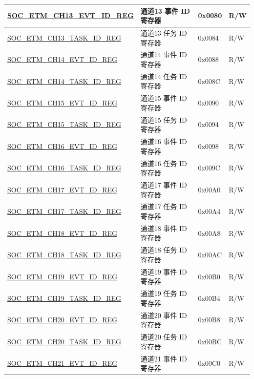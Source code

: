 \begin{longtable}{ | p{6cm} | p{6.2cm} | p{1.3cm} | p{2cm} | }
\hyperref[regdesc:SOCETMCH0EVTIDREG]{SOC\_ETM\_CH13\_EVT\_ID\_REG} & 通道13 事件 ID 寄存器 & 0x0080 & R/W \\ \hline
\hyperref[regdesc:SOCETMCH0TASKIDREG]{SOC\_ETM\_CH13\_TASK\_ID\_REG} & 通道13 任务 ID 寄存器 & 0x0084 & R/W \\ \hline
\hyperref[regdesc:SOCETMCH0EVTIDREG]{SOC\_ETM\_CH14\_EVT\_ID\_REG} & 通道14 事件 ID 寄存器 & 0x0088 & R/W \\ \hline
\hyperref[regdesc:SOCETMCH0TASKIDREG]{SOC\_ETM\_CH14\_TASK\_ID\_REG} & 通道14 任务 ID 寄存器 & 0x008C & R/W \\ \hline
\hyperref[regdesc:SOCETMCH0EVTIDREG]{SOC\_ETM\_CH15\_EVT\_ID\_REG} & 通道15 事件 ID 寄存器 & 0x0090 & R/W \\ \hline
\hyperref[regdesc:SOCETMCH0TASKIDREG]{SOC\_ETM\_CH15\_TASK\_ID\_REG} & 通道15 任务 ID 寄存器 & 0x0094 & R/W \\ \hline
\hyperref[regdesc:SOCETMCH0EVTIDREG]{SOC\_ETM\_CH16\_EVT\_ID\_REG} & 通道16 事件 ID 寄存器 & 0x0098 & R/W \\ \hline
\hyperref[regdesc:SOCETMCH0TASKIDREG]{SOC\_ETM\_CH16\_TASK\_ID\_REG} & 通道16 任务 ID 寄存器 & 0x009C & R/W \\ \hline
\hyperref[regdesc:SOCETMCH0EVTIDREG]{SOC\_ETM\_CH17\_EVT\_ID\_REG} & 通道17 事件 ID 寄存器 & 0x00A0 & R/W \\ \hline
\hyperref[regdesc:SOCETMCH0TASKIDREG]{SOC\_ETM\_CH17\_TASK\_ID\_REG} & 通道17 任务 ID 寄存器 & 0x00A4 & R/W \\ \hline
\hyperref[regdesc:SOCETMCH0EVTIDREG]{SOC\_ETM\_CH18\_EVT\_ID\_REG} & 通道18 事件 ID 寄存器 & 0x00A8 & R/W \\ \hline
\hyperref[regdesc:SOCETMCH0TASKIDREG]{SOC\_ETM\_CH18\_TASK\_ID\_REG} & 通道18 任务 ID 寄存器 & 0x00AC & R/W \\ \hline
\hyperref[regdesc:SOCETMCH0EVTIDREG]{SOC\_ETM\_CH19\_EVT\_ID\_REG} & 通道19 事件 ID 寄存器 & 0x00B0 & R/W \\ \hline
\hyperref[regdesc:SOCETMCH0TASKIDREG]{SOC\_ETM\_CH19\_TASK\_ID\_REG} & 通道19 任务 ID 寄存器 & 0x00B4 & R/W \\ \hline
\hyperref[regdesc:SOCETMCH0EVTIDREG]{SOC\_ETM\_CH20\_EVT\_ID\_REG} & 通道20 事件 ID 寄存器 & 0x00B8 & R/W \\ \hline
\hyperref[regdesc:SOCETMCH0TASKIDREG]{SOC\_ETM\_CH20\_TASK\_ID\_REG} & 通道20 任务 ID 寄存器 & 0x00BC & R/W \\ \hline
\hyperref[regdesc:SOCETMCH0EVTIDREG]{SOC\_ETM\_CH21\_EVT\_ID\_REG} & 通道21 事件 ID 寄存器 & 0x00C0 & R/W \\ \hline

\end{longtable}

